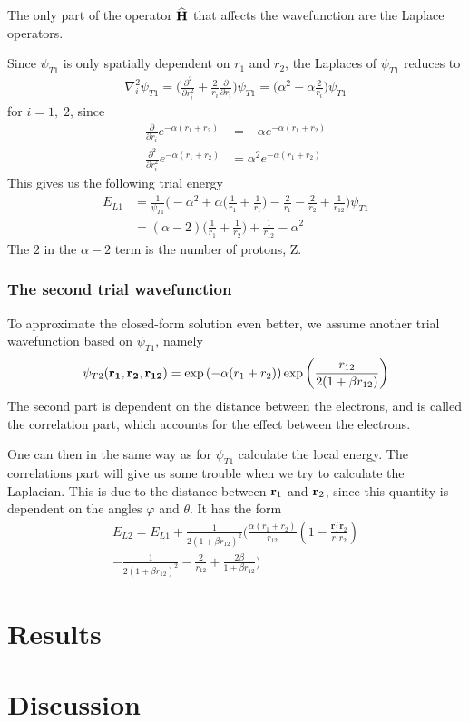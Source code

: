 \documentclass[twocolumn]{article}[12pt]
\newcommand{\eq}[1]{\begin{align*}#1\end{align*}}
\renewcommand\vec[1]{{\bf #1}}
\newcommand{\OP}[1]{{\bf\widehat{#1}}}
\begin{document}
The only part of the operator $\OP H$ that affects the wavefunction
are the Laplace operators.

Since $\psi_{T1}$ is only spatially dependent on $r_1$ and $r_2$,
the Laplaces of $\psi_{T1}$ reduces to
{\small
\eq{
  \nabla_i^2 \psi_{T1} = \bigg( \frac{\partial^2}{\partial r_i^2} 
    + \frac{2}{r_i} \frac{\partial}{\partial r_i} \bigg) \psi_{T1}
    = \bigg( \alpha^2 -\alpha\frac{2}{r_i}  \bigg)\psi_{T1}
}}%
for $i = 1,\;2$, since
{\small
\eq{
  \frac{\partial}{\partial r_i} e^{-\alpha (r_1+r_2)}
    &= -\alpha e^{-\alpha (r_1+r_2)}\\
\frac{\partial^2}{\partial r_i^2} e^{-\alpha (r_1+r_2)}
    &= \alpha^2 e^{-\alpha (r_1+r_2)}
}}%
This gives us the following trial energy
{\small
\eq{
  E_{L1}&=\frac{1}{\psi_{T1}}\bigg( -\alpha^2 
  +\alpha\bigg( \frac{1}{r_1}+\frac{1}{r_1}  \bigg)
    -\frac{2}{r_1}-\frac{2}{r_2} + \frac{1}{r_{12}}
    \bigg)\psi_{T1}\\
  &=(\alpha-2)\bigg( \frac{1}{r_1}+\frac{1}{r_2} \bigg)
    +\frac{1}{r_{12}}-\alpha^2
}}%
The $2$ in the $\alpha-2$ term is the number of protons, Z.

\subsubsection{The second trial wavefunction}
To approximate the closed-form solution even better,
we assume another trial wavefunction based on $\psi_{T1}$, namely
{\small
\eq{
  \psi_{T2} ({\bf r_1},{\bf r_2}, {\bf r_{12}})
    =\exp{\left(-\alpha(r_1+r_2)\right)}
    \exp{\left(\frac{r_{12}}{2(1+\beta r_{12})}\right)}
}}%
The second part is dependent on the distance between the
electrons, and is called the correlation part,
which accounts for the effect between the electrons.

One can then in the same way as for $\psi_{T1}$ calculate
the local energy. The correlations part will give us some trouble
when we try to calculate the Laplacian. This is due to
the distance between $\vec r_1$ and $\vec r_2$, since this quantity
is dependent on the angles $\varphi$ and $\theta$.
It has the form
{\small
\eq{
	E_{L2} = E_{L1}+\frac{1}{2(1+\beta r_{12})^2}
	\bigg(\frac{\alpha(r_1+r_2)}{r_{12}}(1-
	\frac{\mathbf{r}_1^T\mathbf{r}_2}{r_1r_2})\\
	-\frac{1}{2(1+\beta r_{12})^2}-\frac{2}{r_{12}}+
	\frac{2\beta}{1+\beta r_{12}}\bigg)
}}%

\section{Results}

\section{Discussion}
\end{document}
